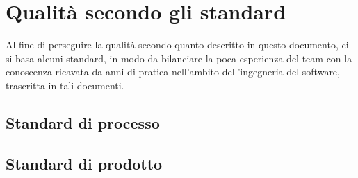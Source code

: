 \section{Qualità secondo gli standard}
Al fine di perseguire la qualità secondo quanto descritto in questo documento, ci si basa alcuni standard, in modo da bilanciare la poca esperienza del team con la conoscenza ricavata da anni di pratica nell'ambito dell'ingegneria del software, trascritta in tali documenti.
\subsection{Standard di processo}

\subsection{Standard di prodotto}
